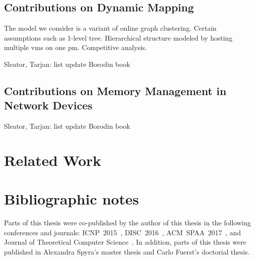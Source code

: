 \newpage

\subsection{Contributions on Dynamic Mapping}
\label{sec:contributions-dynamic-mapping}

The model we consider is a variant of online graph clustering.
Certain assumptions such as 1-level tree. Hierarchical structure modeled by hosting multiple vms on one pm.
Competitive analysis.

Sleator, Tarjan: list update \cite{competitive-analysis}
Borodin book \cite{borodin-book}


\subsection{Contributions on Memory Management in Network Devices}
\label{sec:contributions-packet-forwarding}

Sleator, Tarjan: list update \cite{competitive-analysis}
Borodin book \cite{borodin-book}



\section{Related Work}





\section{Bibliographic notes}

Parts of this thesis were co-published by the author of this thesis in the following conferences and journals: ICNP~2015~\cite{my-icnp}, DISC~2016~\cite{my-disc}, ACM~SPAA~2017~\cite{my-spaa}, and Journal of Theoretical Computer Science~\cite{my-tcs}.
In addition, parts of this thesis were published in Alexandra Spyra's master thesis and Carlo Fuerst's doctorial thesis.